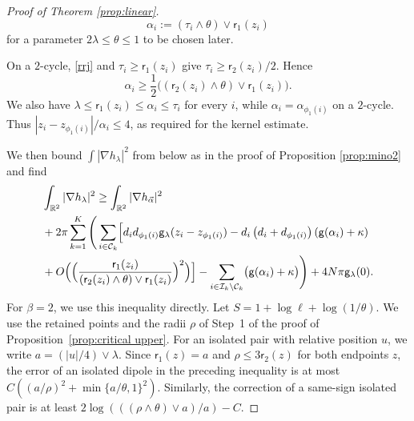 \documentclass[a4paper,10pt,leqno]{amsart}
\numberwithin{equation}{section}
\newcommand{\R}{\mathbb{R}}
\def\nab{\nabla}
\def\g{\mathsf{g}}
\def\rr{\mathsf{r}}
\begin{document}
\begin{proof}[Proof of Theorem \ref{prop:linear}]
  \begin{equation*}
    \alpha_i:= (\tau_i \wedge \theta) \vee \rr_1(z_i)\end{equation*}
  for a parameter $2\lambda\le\theta\le1$ to be chosen later.

  On a $2$-cycle, \eqref{rrj} and $\tau_i\ge\rr_1(z_i)$ give $\tau_i\ge\rr_2(z_i)/2$. Hence
  \[
    \alpha_i\ge\frac12\bigl((\rr_2(z_i)\wedge\theta)\vee\rr_1(z_i)\bigr).
  \]
  We also have $\lambda\le\rr_1(z_i)\le\alpha_i\le\tau_i$ for every $i$, while $\alpha_i=\alpha_{\phi_1(i)}$ on a $2$-cycle. Thus $|z_i-z_{\phi_1(i)}|/\alpha_i\le4$, as required for the kernel estimate.

  We then bound $\int |\nabla h_{\lambda}|^2$ from below as in the proof of Proposition \ref{prop:mino2} and find
  \begin{align*}
    & \int_{\R^2} |\nab h_{\lambda}|^2
    \ge \int_{\R^2} |\nab h_{\vec{\alpha}}|^2 \\
    &
    + 2\pi\sum_{k=1}^K \Bigg( \sum_{i\in \mathcal C_k} \Bigl[d_i d_{\phi_1(i)} \g_\lambda(z_i-z_{\phi_1(i)} ) -d_i \left( d_i+ d_{\phi_1(i)} \right)(\g(\alpha_i)+\kappa) \\
    & + O\Bigr( \Bigr( \frac{\rr_1(z_i)}{(\rr_2(z_i)\wedge \theta) \vee \rr_1(z_i) }\Bigr)^2\Bigr)\Bigr]
    -\sum_{i\in \mathcal{I}_k \backslash \mathcal C_k} \bigl(\g(\alpha_i)+\kappa\bigr) \Bigg)+4N\pi \g_\lambda(0).
  \end{align*}
  For $\beta=2$, we use this inequality directly. Let $S=1+\log\ell+\log(1/\theta)$. We use the retained points and the radii $\rho$ of Step~1 of the proof of Proposition~\ref{prop:critical upper}. For an isolated pair with relative position $u$, we write $a=(|u|/4)\vee\lambda$. Since $\rr_1(z)=a$ and $\rho\le3\rr_2(z)$ for both endpoints $z$, the error of an isolated dipole in the preceding inequality is at most $C((a/\rho)^2+\min\{a/\theta,1\}^2)$. Similarly, the correction of a same-sign isolated pair is at least $2\log(((\rho\wedge\theta)\vee a)/a)-C$.


\end{proof}
\end{document}
